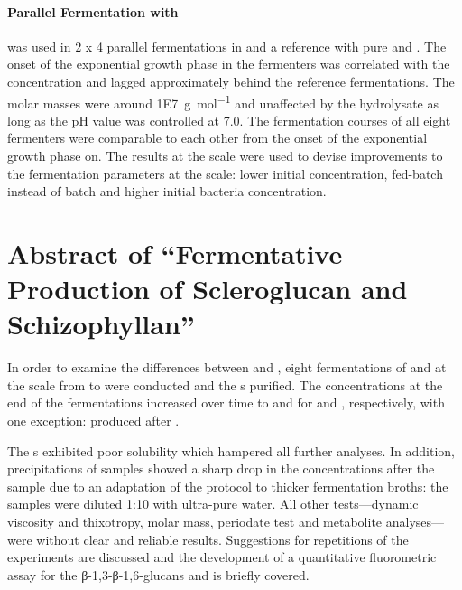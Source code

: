 \paragraph{Parallel Fermentation with \LCH{}}
\strain{} was used in 2 x 4  parallel fermentations in \lch{} and a reference with pure \glc{} and \xyl{}. The onset of the exponential growth phase in the \lch{} fermenters was correlated with the \fur{} concentration and lagged approximately  behind the reference fermentations. The \eps{} molar masses were around \SI{1E7}{\gram\per\mole} and unaffected by the hydrolysate as long as the pH value was controlled at 7.0. The fermentation courses of all eight fermenters were comparable to each other from the onset of the exponential growth phase on. The results at the  scale were used to devise improvements to the fermentation parameters at the  scale: lower initial \lch{} concentration, fed-batch instead of batch and higher initial bacteria concentration.

\section*{Abstract of \enquote{Fermentative Production of Scleroglucan and Schizophyllan}}
In order to examine the differences between \scl{} and \shz{}, eight fermentations of \rolf{} and \comm{} at the  scale from  to  were conducted and the \eps{}s purified. The \eps{} concentrations at the end of the fermentations increased over time to  and  for \scl{} and \shz{}, respectively, with one exception: \comm{} produced  \shz{} after .

The \eps{}s exhibited poor solubility which hampered all further analyses. In addition, precipitations of samples showed a sharp drop in the \eps{} concentrations after the  sample due to an adaptation of the protocol to thicker fermentation broths: the samples were diluted 1:10 with ultra-pure water. All other tests---dynamic viscosity and thixotropy, molar mass, periodate test and metabolite analyses---were without clear and reliable results. Suggestions for repetitions of the experiments are discussed and the development of a quantitative fluorometric assay for the β-1,3-β-1,6-glucans \scl{} and \shz{} is briefly covered.
\clearpage

